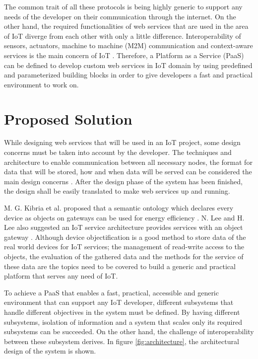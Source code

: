  The common trait of all these protocols is being highly generic to support any needs of the developer on their communication through the internet. On the other hand, the required functionalities of web services that are used in the area of IoT diverge from each other with only a little difference. Interoperability of sensors, actuators, machine to machine (M2M) communication and context-aware services is the main concern of IoT \cite{6651222}. Therefore, a Platform as a Service (PaaS) can be defined to develop custom web services in IoT domain by using predefined and parameterized building blocks in order to give developers a fast and practical environment to work on.

\section{Proposed Solution}



While designing web services that will be used in an IoT project, some design concerns must be taken into account by the developer. The techniques and architecture to enable communication between all necessary nodes, the format for data that will be stored, how and when data will be served can be considered the main design concerns \cite{6651222}. After the design phase of the system has been finished, the design shall be easily translated to make web services up and running. 

M. G. Kibria et al. proposed that a semantic ontology which declares every device as objects on gateways can be used for energy efficiency \cite{7993747}. N. Lee and H. Lee also suggested an IoT service architecture provides services with an object gateway \cite{6884496}. Although device objectification is a good method to store data of the real world devices for IoT services; the management of read-write access to the objects, the evaluation of the gathered data and the methods for the service of these data are the topics need to be covered to build a generic and practical platform that serves any need of IoT. 


To achieve a PaaS that enables a fast, practical, accessible and generic environment that can support any IoT developer, different subsystems that handle different objectives in the system must be defined. By having different subsystems,  isolation of information and a system that scales only its required subsystems can be succeeded. On the other hand, the challenge of interoperability between these subsystem derives. In figure \ref{fig:architecture}, the architectural design of the system is shown.

